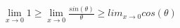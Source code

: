 \documentclass[preview]{standalone}
\begin{document}
\begin{align*}
\lim_{x\to0} 1 \geq \lim_{x\to0} \frac{sin(\theta)}{\theta} \geq lim_{x\to0} cos(\theta)
\end{align*}
\end{document}
